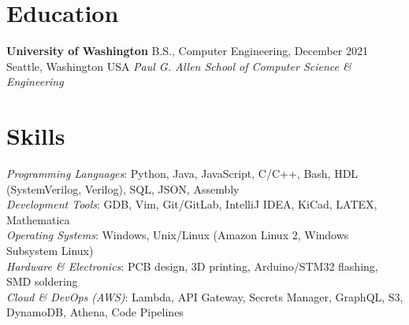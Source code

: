 \documentclass[margin,line]{res}
\newenvironment{list1}{
  \begin{list}{\ding{113}}{%
      \setlength{\itemsep}{0in}
      \setlength{\parsep}{0in} \setlength{\parskip}{0in}
      \setlength{\topsep}{0in} \setlength{\partopsep}{0in} 
      \setlength{\leftmargin}{0.17in}}}{\end{list}}
\begin{document}
\begin{resume}
\section{\sc Education}

{\bf University of Washington} \hfill B.S., Computer Engineering, December 2021 \\
Seattle, Washington USA \hfill {\em Paul G. Allen School of Computer Science \& Engineering} \\



\section{\sc Skills} %
    {\em Programming Languages}:  
    Python, Java, JavaScript, C/C++, Bash, HDL (SystemVerilog, Verilog), SQL, JSON, Assembly
    \\
    {\em Development Tools}:  
    GDB, Vim, Git/GitLab, IntelliJ IDEA, KiCad, LATEX, Mathematica
    \\
    {\em Operating Systems}:  
    Windows, Unix/Linux (Amazon Linux 2, Windows Subsystem Linux)
    \\
    {\em Hardware \& Electronics}:  
    PCB design, 3D printing, Arduino/STM32 flashing, SMD soldering
    \\
    {\em Cloud \& DevOps (AWS)}:  
    Lambda, API Gateway, Secrets Manager, GraphQL, S3, DynamoDB, Athena, Code Pipelines


\end{resume}
\end{document}
